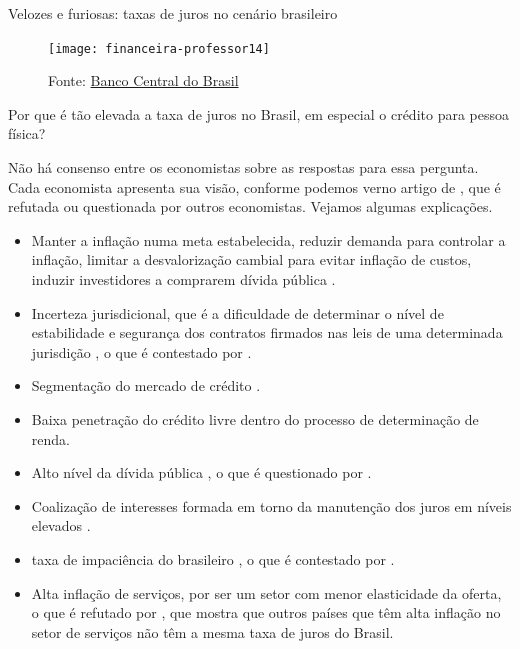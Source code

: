 \begin{paginatexto}{Velozes e furiosas: taxas de juros no cenário brasileiro}
\begin{figure}[H]
\centering

\texttt{[image: financeira-professor14]}

\caption{Fonte: \href{https://www.bcb.gov.br/estatisticas/txjuros}{Banco Central do Brasil}}
\end{figure}

Por que é tão elevada a taxa de juros no Brasil, em especial o crédito para pessoa física?

Não há consenso entre os economistas sobre as respostas para essa pergunta. Cada economista apresenta sua visão, conforme podemos verno artigo de \cite{BARBOZA2015}, que é refutada ou questionada por outros economistas. Vejamos algumas explicações.

\begin{itemize}
  \item Manter a inflação numa meta estabelecida, reduzir demanda para controlar a inflação, limitar a desvalorização cambial para evitar inflação de custos, induzir investidores a comprarem dívida pública \citep{bresser2002}.

  \item Incerteza jurisdicional, que é a dificuldade de determinar o nível de estabilidade e segurança dos contratos firmados nas leis de uma determinada jurisdição \citep{arida2004}, o que é contestado por \cite{gonccalves2007}.

  \item Segmentação do mercado de crédito \citep{BARBOZA2015}.

  \item Baixa penetração do crédito livre dentro do processo de determinação de renda.

  \item Alto nível da dívida pública \citep{favero2002}, o que é questionado por \cite{muinhos2006}.

  \item  Coalização de interesses formada em torno da manutenção dos juros em níveis elevados \citep{erber2008}.

  \item taxa de impaciência do brasileiro \citep{Barros2011}, o que é contestado por \cite{Schwartsman2011}.

  \item Alta inflação de serviços, por ser um setor com menor elasticidade da oferta, o que é refutado por \cite{Baumol2012}, que mostra que outros países que têm alta inflação no setor de serviços não têm a mesma taxa de juros do Brasil.
\end{itemize}


\end{paginatexto}
